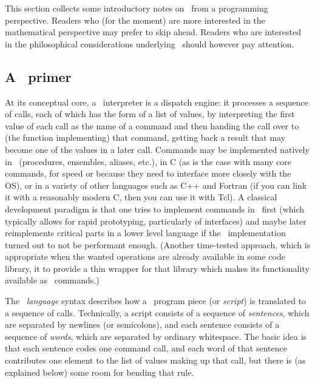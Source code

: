 \documentclass{mtmtcl}
\theoremstyle{plain}
\theoremstyle{remark}
\begin{document}
This section collects some introductory notes on \mtl\ from a 
programming perspective. Readers who (for the moment) are more 
interested in the mathematical perspective may prefer to skip ahead. 
Readers who are interested in the philosophical considerations 
underlying \mtl\ should however pay attention.


\subsection{A \Tcl\ primer}

At its conceptual core, a \Tcl\ interpreter is a dispatch engine: it 
processes a sequence of calls, each of which has the form of a list of 
values, by interpreting the first value of each call as the name of a 
command and then handing the call over to (the function implementing) 
that command, getting back a result that may become one of the values 
in a later call. Commands may be implemented natively in \Tcl\ 
(procedures, ensembles, aliases, etc.), in C (as is the case with many 
core commands, for speed or because they need to interface more 
closely with the OS), or in a variety of other languages such as C++ 
and Fortran (if you can link it with a reasonably modern C, then you can 
use it with Tcl). A classical development paradigm is that one 
tries to implement commands in \Tcl\ first (which typically allows for 
rapid prototyping, particularly of interfaces) and maybe later 
reimplements critical parts in a lower level language if the \Tcl\ 
implementation turned out to not be performant enough. (Another 
time-tested approach, which is appropriate when the wanted operations 
are already available in some code library, it to provide a thin 
wrapper for that library which makes its functionality available as 
\Tcl\ commands.)

The \Tcl\ \emph{language} syntax describes how a \Tcl\ program piece 
(or \emph{script}) is translated to a sequence of calls. Technically, a 
script consists of a sequence of \emph{sentences}, which are 
separated by newlines (or semicolons), and each sentence consists of 
a sequence of \emph{words}, which are separated by ordinary 
whitespace. The basic idea is that each sentence codes one command 
call, and each word of that sentence contributes one element to the 
list of values making up that call, but there is (as explained below) 
some room for bending that rule.
\end{document}
